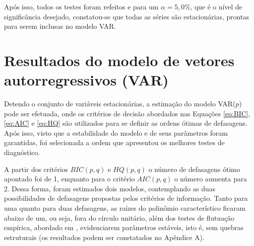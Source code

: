 Após isso, todos os testes foram refeitos e para um $\alpha = 5,0\%$, que é o nível de significância desejado, constatou-se que todas as séries são estacionárias, prontas para serem inclusas no modelo VAR.






\section{Resultados do modelo de vetores autorregressivos (VAR)} \label{section:VAR}

Detendo o conjunto de variáveis estacionárias, a estimação do modelo VAR($p$) pode ser efetuada, onde os critérios de decisão abordados nas Equações \eqref{eq:BIC}, \eqref{eq:AIC} e \eqref{eq:HQ} são utilizados para se definir as ordens ótimas de defasagens. Após isso, visto que a estabilidade do modelo e de seus parâmetros foram garantidas, foi selecionada a ordem que apresentou os melhores testes de diagnóstico.

A partir dos critérios $BIC(p,q)$ e $HQ(p,q)$ o número de defasagens ótimo apontado foi de 1, enquanto para o critério $AIC(p,q)$ o número aumenta para 2. Dessa forma, foram estimados dois modelos, contemplando as duas possibilidades de defasagens propostas pelos critérios de informação. Tanto para uma quanto para duas defasagens, as raízes do polinômio característico ficaram abaixo de um, ou seja, fora do círculo unitário, além dos testes de flutuação empírica, abordado em , evidenciarem parâmetros estáveis, isto é, sem quebras estruturais (os resultados podem ser constatados no Apêndice A).

